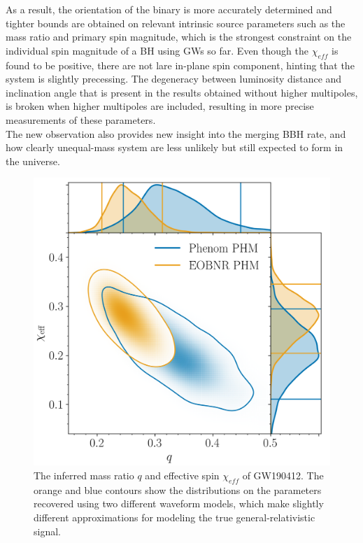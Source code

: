 \documentclass[binding=0.6cm, LaM]{sapthesis}
\begin{document}
	As a result, the orientation of the binary is more accurately determined and 
	tighter bounds are obtained on relevant intrinsic source parameters such as the mass ratio and primary spin magnitude, 
	which is the strongest constraint on the individual spin magnitude of a BH using GWs so far. 
	Even though the $\chi_{eff}$ is found to be positive, there are not lare in-plane spin component, 
	hinting that the system is slightly precessing.
	The degeneracy between luminosity distance and inclination angle that is present 
	in the results obtained without higher multipoles, is broken when higher multipoles are included, 
	resulting in more precise measurements of these parameters. \\ 
	The new observation also provides new insight into the merging BBH rate, 
	and how clearly unequal-mass system are less unlikely but still expected to form in the universe. \cite{133}
                \begin{figure}[H]
                        \label{asymmetric}
                        \includegraphics[scale=0.2]{asymmetric}
                        \centering
                        \caption{The inferred mass ratio $q$ and effective spin $\chi_{eff}$ of GW190412. 
				 The orange and blue contours show the distributions on the parameters 
				 recovered using two different waveform models, which make slightly different 
				 approximations for modeling the true general-relativistic signal.\cite{133} 
                                 } 
                        \label{fig:asymmetric}
                \end{figure}
\end{document}
